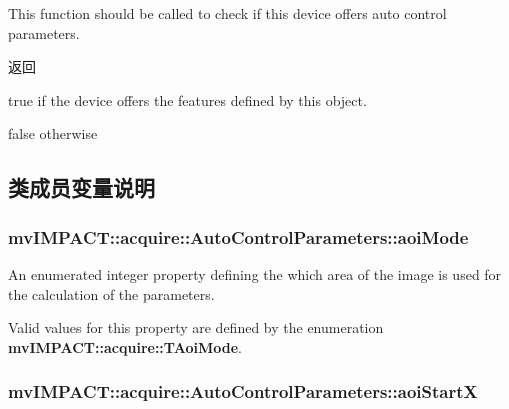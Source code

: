 This function should be called to check if this device offers auto control parameters. 

\begin{DoxyReturn}{返回}

\begin{DoxyItemize}
\item true if the device offers the features defined by this object.
\item false otherwise 
\end{DoxyItemize}
\end{DoxyReturn}


\subsection{类成员变量说明}
\hypertarget{classmv_i_m_p_a_c_t_1_1acquire_1_1_auto_control_parameters_ae1c292764fb42e9a4b84f94b14b9f677}{
\subsubsection[{aoi\+Mode}]{ mv\+I\+M\+P\+A\+C\+T\+::acquire\+::\+Auto\+Control\+Parameters\+::aoi\+Mode}}\label{classmv_i_m_p_a_c_t_1_1acquire_1_1_auto_control_parameters_ae1c292764fb42e9a4b84f94b14b9f677}


An enumerated integer property defining the which area of the image is used for the calculation of the parameters. 

Valid values for this property are defined by the enumeration {\bfseries mv\+I\+M\+P\+A\+C\+T\+::acquire\+::\+T\+Aoi\+Mode}. \hypertarget{classmv_i_m_p_a_c_t_1_1acquire_1_1_auto_control_parameters_a1149e8b2769f11e35c60a64112570706}{
\subsubsection[{aoi\+Start\+X}]{ mv\+I\+M\+P\+A\+C\+T\+::acquire\+::\+Auto\+Control\+Parameters\+::aoi\+Start\+X}}\label{classmv_i_m_p_a_c_t_1_1acquire_1_1_auto_control_parameters_a1149e8b2769f11e35c60a64112570706}


